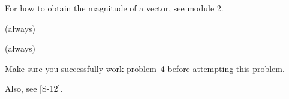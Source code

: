 {
{For how to obtain the magnitude of a vector, see module 2.
}

{ (always)

  (always)

 Make sure you successfully work problem~4 before attempting this problem.

 Also, see [S-12].
}

}%
